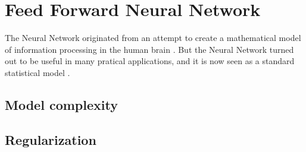 \section{Feed Forward Neural Network}\label{sec:feed-forward-neural-network}
The Neural Network originated from an attempt to create a mathematical model of information processing in the human brain \citep[p.226]{bishop}. But the Neural Network turned out to be useful in many pratical applications, and it is now seen as a standard statistical model \citep[p.392]{hastie09}.
\subsection{Model complexity}
\subsection{Regularization}



